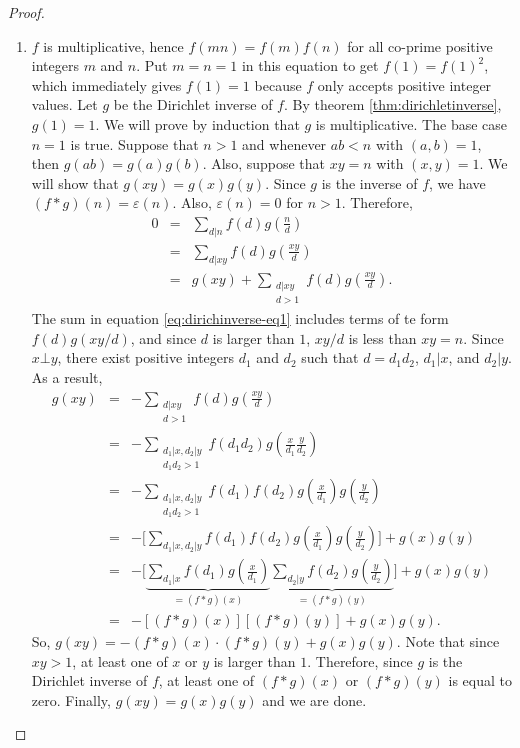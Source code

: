 \documentclass[12pt]{subfile}
\begin{document}
\begin{proof}
\begin{enumerate}
				\item $f$ is multiplicative, hence $f(mn)=f(m)f(n)$ for all co-prime positive integers $m$ and $n$. Put $m=n=1$ in this equation to get $f(1)=f(1)^2$, which immediately gives $f(1)=1$ because $f$ only accepts positive integer values. Let $g$ be the Dirichlet inverse of $f$. By theorem \ref{thm:dirichletinverse}, $g(1)=1$. We will prove by induction that $g$ is multiplicative. The base case $n=1$ is true. Suppose that $n>1$ and whenever $ab<n$ with $(a,b)=1$, then $g(ab)=g(a)g(b)$. Also, suppose that $xy=n$ with $(x,y)=1$. We will show that $g(xy)=g(x)g(y)$. Since $g$ is the inverse of $f$, we have $(f \ast g)(n) = \varepsilon(n)$. Also, $\varepsilon(n)=0$ for $n>1$. Therefore,
					\begin{eqnarray}
						0 &=& \sum_{d|n} f(d) g\left(\frac{n}{d}\right)\nonumber\\
						  &=& \sum_{d|xy} f(d) g\left(\frac{xy}{d}\right) \nonumber\\
						  &=& g(xy) + \sum\limits_{\substack{d|xy \\ d>1}} f(d) g\left(\frac{xy}{d}\right).\label{eq:dirichinverse-eq1}
					\end{eqnarray}
				The sum in equation \ref{eq:dirichinverse-eq1} includes terms of te form $f(d)g(xy/d)$, and since $d$ is larger than $1$, $xy/d$ is less than $xy=n$. Since $x \bot y$, there exist positive integers $d_1$ and $d_2$ such that $d=d_1d_2$, $d_1|x$, and $d_2|y$. As a result,
					\begin{eqnarray*}
						g(xy) &=& - \sum\limits_{\substack{d|xy \\ d>1}} f(d) g\left(\frac{xy}{d}\right)\\
							  &=& - \sum\limits_{\substack{d_1|x, d_2|y \\ d_1d_2>1}} f(d_1d_2) g\left(\frac{x}{d_1} \frac{y}{d_2}\right)\\
							  &=& - \sum\limits_{\substack{d_1|x, d_2|y \\ d_1d_2>1}} f(d_1)f(d_2) g\left(\frac{x}{d_1}\right) g\left(\frac{y}{d_2}\right)\\
							  &=& - \bigg[\sum\limits_{d_1|x, d_2|y} f(d_1)f(d_2) g\left(\frac{x}{d_1}\right) g\left(\frac{y}{d_2}\right)\bigg] + g(x)g(y)\\
							  &=& - \bigg[\underbrace{\sum\limits_{d_1|x} f(d_1) g\left(\frac{x}{d_1}\right)}_{=(f \ast g)(x)} \underbrace{\sum\limits_{d_2|y} f(d_2) g\left(\frac{y}{d_2}\right)}_{=(f \ast g)(y)} \bigg] + g(x)g(y)\\
							  &=& -\left[(f \ast g)(x)\right] \left[(f\ast g)(y)\right] + g(x)g(y).
					\end{eqnarray*}
				So, $g(xy)= -(f \ast g)(x) \cdot (f\ast g)(y) + g(x)g(y)$. Note that since $xy>1$, at least one of $x$ or $y$ is larger than $1$. Therefore, since $g$ is the Dirichlet inverse of $f$, at least one of $(f \ast g)(x)$ or $(f \ast g)(y)$ is equal to zero. Finally, $g(xy)=g(x)g(y)$ and we are done.


\end{enumerate}
\end{proof}
\end{document}
